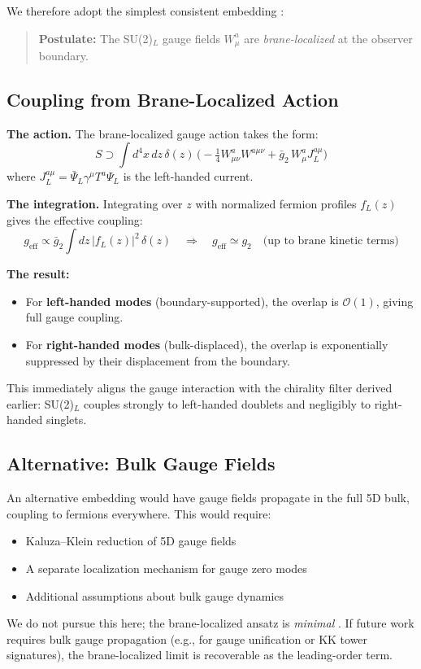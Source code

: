 We therefore adopt the simplest consistent embedding \tagP{}:
\begin{quote}
\textbf{Postulate:} The SU(2)$_L$ gauge fields $W_\mu^a$ are \emph{brane-localized}
at the observer boundary.
\end{quote}

\subsection{Coupling from Brane-Localized Action}

\textbf{The action.} The brane-localized gauge action takes the form:
\begin{equation}
    S \supset \int d^4x\,dz\,\delta(z)\,\Big(-\tfrac{1}{4} W^a_{\mu\nu}W^{a\mu\nu}
    + \bar{g}_2\,W^a_\mu J_L^{a\mu}\Big)
    \label{eq:ch9_brane_gauge_action}
\end{equation}
where $J_L^{a\mu} = \bar\Psi_L \gamma^\mu T^a \Psi_L$ is the left-handed current.

\textbf{The integration.} Integrating over $z$ with normalized fermion profiles
$f_L(z)$ gives the effective coupling:
\begin{equation}
    g_{\text{eff}} \propto \bar{g}_2 \int dz\,|f_L(z)|^2\,\delta(z)
    \quad\Rightarrow\quad
    g_{\text{eff}} \simeq g_2 \quad \text{(up to brane kinetic terms)}
    \label{eq:ch9_geff}
\end{equation}

\textbf{The result:}
\begin{itemize}[nosep]
    \item For \textbf{left-handed modes} (boundary-supported), the overlap is
          $\mathcal{O}(1)$, giving full gauge coupling.
    \item For \textbf{right-handed modes} (bulk-displaced), the overlap is
          exponentially suppressed by their displacement from the boundary.
\end{itemize}

This immediately aligns the gauge interaction with the chirality filter derived
earlier: SU(2)$_L$ couples strongly to left-handed doublets and negligibly to
right-handed singlets.

\subsection{Alternative: Bulk Gauge Fields}

An alternative embedding would have gauge fields propagate in the full 5D bulk,
coupling to fermions everywhere. This would require:
\begin{itemize}[nosep]
    \item Kaluza--Klein reduction of 5D gauge fields
    \item A separate localization mechanism for gauge zero modes
    \item Additional assumptions about bulk gauge dynamics
\end{itemize}
We do not pursue this here; the brane-localized ansatz is \emph{minimal} \tagP{}.
If future work requires bulk gauge propagation (e.g., for gauge unification or
KK tower signatures), the brane-localized limit is recoverable as the leading-order term.

